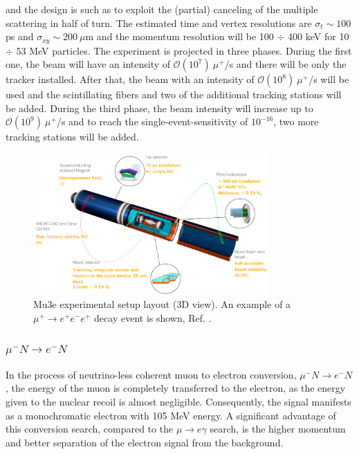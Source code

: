 and the design is such as to exploit the (partial) canceling of
the multiple scattering in half of turn. The estimated time and vertex resolutions are
$\sigma_t \sim 100$ ps and $\sigma_{xy} \sim 200 \ \mu$m and the momentum resolution will be 100 $\div$ 400 keV for 10 $\div$ 53
MeV particles. The experiment is projected in three phases. During the first one, the beam will have an intensity of $\mathcal{O}(10^7) \ \mu^+$/s 
and there will be only the tracker installed. After that, the beam with an intensity of $\mathcal{O}(10^8) \ \mu^+$/s will 
be used and the scintillating fibers and two of the additional tracking stations will be added.
During the third phase, the beam intensity will increase up to $\mathcal{O}(10^9) \ \mu^+$/s and to 
reach the single-event-sensitivity of $10^{-16}$, two more tracking stations will be added.
\begin{figure}[!h]
\centering
\includegraphics[width =0.8\textwidth]{figures/png/Screenshot_20240321_143650}
\caption[Mu3e experiment.]{Mu3e experimental setup layout (3D view). An example of a $\mu^+ \rightarrow e^+ e^-  e^+ $ decay event is shown, Ref. \cite{papa}.}
\label{fig:mu3e}
\end{figure}









\subsubsection{$\mu^- N \rightarrow e^- N $}
In the process of neutrino-less coherent muon to electron conversion, 
$\mu^- N \rightarrow e^- N$, the energy of the muon is completely 
transferred to the electron, as the energy given to the nuclear 
recoil is almost negligible. Consequently, the signal manifests 
as a monochromatic electron with 105 MeV energy. A significant 
advantage of this conversion search, compared to the 
$\mu \rightarrow e \gamma$ search, is the higher momentum 
and better separation of the electron signal from the background.

